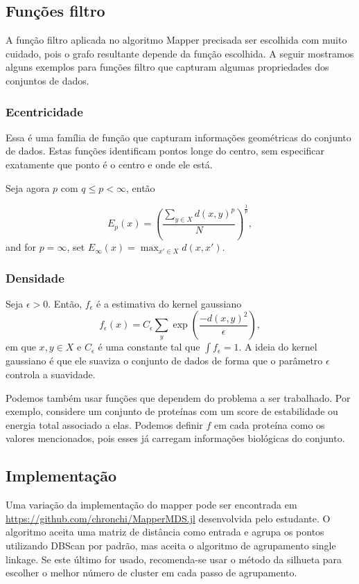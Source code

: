 \subsection{Funções filtro}

A função filtro aplicada no algoritmo Mapper precisada ser escolhida com muito cuidado, pois o
grafo resultante depende da função escolhida. A seguir mostramos alguns exemplos para funções
filtro que capturam algumas propriedades dos conjuntos de dados.

\subsubsection{Ecentricidade}

Essa é uma família de função que capturam informações geométricas do conjunto de dados. Estas funções
identificam pontos longe do centro, sem especificar exatamente que ponto é o centro e onde ele está. 

Seja agora $p$ com $q \leq p < \infty$, então

\begin{equation}
    E_p(x) = \left( \frac{\sum_{y\in X} d(x,y)^p}{N} \right)^{\frac{1}{p}},
\end{equation}
and for $p = \infty$, set $E_\infty(x) = \max_{x' \in X} d(x,x')$. 

\subsubsection{Densidade} 

Seja $\epsilon > 0$. Então, $f_\epsilon$ é a estimativa do kernel gaussiano  
\begin{equation}
    f_\epsilon (x) = C_\epsilon \sum_y \exp\left( \frac{-d(x,y)^2}{\epsilon}\right),
\end{equation}
em que $x,y \in X$ e $C_\epsilon$ é uma constante tal que $\int f_\epsilon = 1$. A ideia 
do kernel gaussiano é que ele suaviza o conjunto de dados de forma que o parâmetro $\epsilon$ 
controla a suavidade. 

Podemos também usar funções que dependem do problema a ser trabalhado. Por exemplo, considere
um conjunto de proteínas com um score de estabilidade ou energia total associado a elas. Podemos
definir $f$ em cada proteína como os valores mencionados, pois esses já carregam informações
biológicas do conjunto. 

\subsection{Implementação} 

Uma variação da implementação do mapper pode ser encontrada em \url{https://github.com/chronchi/MapperMDS.jl}
desenvolvida pelo estudante. O algoritmo aceita uma matriz de distância como entrada e agrupa os pontos
utilizando DBScan \cite{Ester96} por padrão, mas aceita o algoritmo de agrupamento single linkage. 
Se este último for usado, recomenda-se usar o método da silhueta \cite{Rousseeuw1987} para escolher 
o melhor número de cluster em cada passo de agrupamento. 
